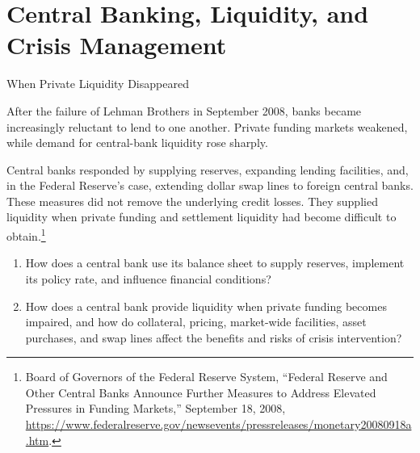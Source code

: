 \chapter{Central Banking, Liquidity, and Crisis Management}
\label{chap:Central_Banking_Liquidity_and_Crisis_Management}

\begin{openingcase}{When Private Liquidity Disappeared}

After the failure of Lehman Brothers in September 2008, banks became increasingly reluctant to lend to one another. Private funding markets weakened, while demand for central-bank liquidity rose sharply.

Central banks responded by supplying reserves, expanding lending facilities, and, in the Federal Reserve's case, extending dollar swap lines to foreign central banks. These measures did not remove the underlying credit losses. They supplied liquidity when private funding and settlement liquidity had become difficult to obtain.\footnote{Board of Governors of the Federal Reserve System, ``Federal Reserve and Other Central Banks Announce Further Measures to Address Elevated Pressures in Funding Markets,'' September 18, 2008, \url{https://www.federalreserve.gov/newsevents/pressreleases/monetary20080918a.htm}.}

\end{openingcase}

\begin{tcolorbox}[
  enhanced,
  colback=FinanceBlue!6,
  colframe=FinanceBlue,
  boxrule=0.6pt,
  sharp corners,
  left=8pt,
  right=8pt,
  top=7pt,
  bottom=7pt,
  before skip=1em,
  after skip=1.6em,
  title=\textbf{Core Questions},
  coltitle=white,
  colbacktitle=FinanceBlue,
  fonttitle=\bfseries,
  attach boxed title to top left={xshift=6pt,yshift=-2mm},
  boxed title style={
    boxrule=0pt,
    sharp corners,
    left=5pt,
    right=5pt,
    top=2pt,
    bottom=2pt
  }
]
\begin{enumerate}[
  leftmargin=*,
  label=\textcolor{FinanceBlue}{\textbf{\arabic*.}},
  itemsep=0.55em,
  topsep=0.2em
]



\item How does a central bank use its balance sheet to supply reserves, implement its policy rate, and influence financial conditions?

\item How does a central bank provide liquidity when private funding becomes impaired, and how do collateral, pricing, market-wide facilities, asset purchases, and swap lines affect the benefits and risks of crisis intervention?

\end{enumerate}
\end{tcolorbox}


